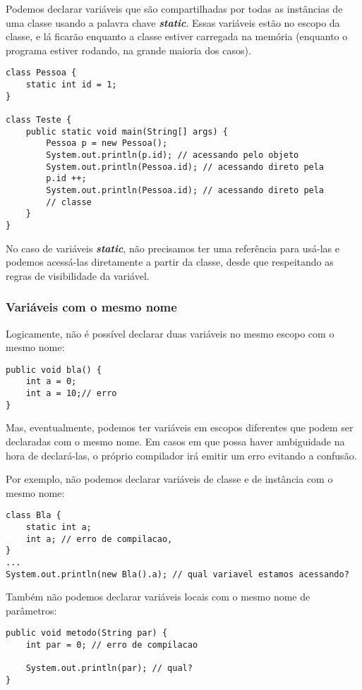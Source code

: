 \documentclass[12pt]{article}
\begin{document}
Podemos declarar variáveis que são compartilhadas por todas as instâncias de uma classe usando a palavra chave \textbf{\textit{static}}. Essas variáveis estão no escopo da classe, e lá ficarão enquanto a classe estiver carregada na memória (enquanto o programa estiver rodando, na grande maioria dos casos).

\begin{lstlisting}
class Pessoa {
	static int id = 1;
}
	
class Teste {
	public static void main(String[] args) {
		Pessoa p = new Pessoa();
		System.out.println(p.id); // acessando pelo objeto
		System.out.println(Pessoa.id); // acessando direto pela
		p.id ++;
		System.out.println(Pessoa.id); // acessando direto pela
		// classe
	}
}
\end{lstlisting}

No caso de variáveis \textbf{\textit{static}}, não precisamos ter uma referência para usá-las e podemos acessá-las diretamente a partir da classe, desde que respeitando as regras de visibilidade da variável.

\subsubsection{Variáveis com o mesmo nome}

Logicamente, não é possível declarar duas variáveis no mesmo escopo com o mesmo nome:

\begin{lstlisting}
public void bla() {
	int a = 0;
	int a = 10;// erro
}
\end{lstlisting}

Mas, eventualmente, podemos ter variáveis em escopos diferentes que podem ser declaradas com o mesmo nome. Em casos em que possa haver ambiguidade na hora de declará-las, o próprio compilador irá emitir um erro evitando a confusão.

Por exemplo, não podemos declarar variáveis de classe e de instância com o mesmo nome:

\begin{lstlisting}
class Bla {
	static int a;
	int a; // erro de compilacao,
}
...
System.out.println(new Bla().a); // qual variavel estamos acessando?
\end{lstlisting}

Também não podemos declarar variáveis locais com o mesmo nome de parâmetros:

\begin{lstlisting}
public void metodo(String par) {
	int par = 0; // erro de compilacao
	
	System.out.println(par); // qual?
}
\end{lstlisting}
\end{document}
